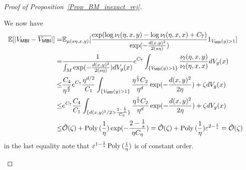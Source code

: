 \begin{proof}[Proof of Proposition~\ref{Prop_BM_inexact_rej}]
\begin{enumerate}
We now have
        \begin{align*}
                \mathbb{E}[|V_{\mathsf{MBI}} - \overline{V_{\mathsf{MBI}}}|] = &\mathbb{E}_{\mu(s\eta, x, y)}[\frac{\exp(\log \nu_{l}(\eta, x, y) - \log \nu_{l}(\eta, x, x) + C_{7})}{\exp(-\frac{d(x, y)^{2}}{2(s\eta)})} 1_{V_{\mathsf{MBI}}(y) > 1}] \\
                = & \frac{1}{\int_{M} \exp(-\frac{d(x, y)^{2}}{2(s\eta)}) dV_{g}(x)} e^{C_{7}}\int_{\{V_{\mathsf{MBI}}(y) > 1\}} \frac{\nu_{l}(\eta, x, y)}{\nu_{l}(\eta, x, x)} dV_{g}(x)\\
                \le & \frac{C_{4}}{\eta^{\frac{d}{2}}} e^{C_{7}} 
                \frac{\eta^{d/2}}{C_{1}}
                \int_{\{V_{\mathsf{MBI}}(y) > 1\}} \frac{\eta^{\frac{1}{2}} C_{2}}{\eta^{d}} \exp(-\frac{d(x, y)^{2}}{2\eta}) + \zeta dV_{g}(x)\\
                \le & e^{C_{7}} \frac{C_{4}}{C_{1}}
                \int_{\{d(x, y)^{2}/2 > \frac{2-\frac{1}{s}}{C_{\eta}}\}} \frac{\eta^{\frac{1}{2}} C_{2}}{\eta^{d}} \exp(-\frac{d(x, y)^{2}}{2\eta}) + \zeta dV_{g}(x)\\
                \le & \tilde{\mathcal{O}}(\zeta)+ \operatorname{Poly\,}(\frac{1}{\eta}) \exp(-\frac{2-\frac{1}{s}}{\eta C_{\eta}})
                = \tilde{\mathcal{O}}(\zeta) + \operatorname{Poly\,}(\frac{1}{\eta}) \varepsilon^{2-\frac{1}{s}}
                = \tilde{\mathcal{O}}(\zeta)
        \end{align*}
        in the last equality note that $\varepsilon^{1-\frac{1}{s}} \operatorname{Poly\,}(\frac{1}{\eta})$ is of constant order.
    \end{enumerate}
\end{proof}


